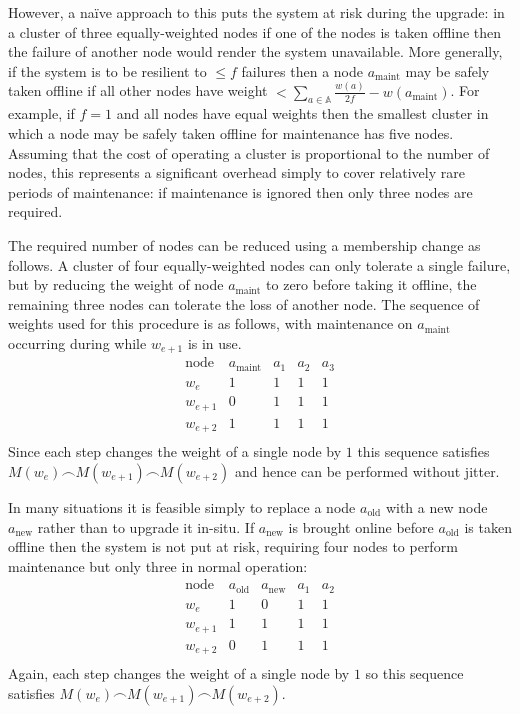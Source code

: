 \documentclass[journal]{IEEEtran}
\begin{document}
However, a na\"ive approach to this puts the system at risk during the upgrade:
in a cluster of three equally-weighted nodes if one of the nodes is taken
offline then the failure of another node would render the system unavailable.
More generally, if the system is to be resilient to $\le f$ failures then a
node $a_{\textrm{maint}}$ may be safely taken offline if all other nodes have
weight $< \sum_{a \in \mathbb A} \frac{w(a)}{2f} - w(a_{\textrm{maint}})$. For
example, if $f = 1$ and all nodes have equal weights then the smallest cluster
in which a node may be safely taken offline for maintenance has five nodes.
Assuming that the cost of operating a cluster is proportional to the number of
nodes, this represents a significant overhead simply to cover relatively rare
periods of maintenance: if maintenance is ignored then only three nodes are
required.

The required number of nodes can be reduced using a membership change as
follows. A cluster of four equally-weighted nodes can only tolerate a single
failure, but by reducing the weight of node $a_{\textrm{maint}}$ to zero before
taking it offline, the remaining three nodes can tolerate the loss of another
node. The sequence of weights used for this procedure is as follows, with
maintenance on $a_{\textrm{maint}}$ occurring during while $w_{e+1}$ is in use.
\[\begin{array}{rcccc}
\textrm{node}&a_{\textrm{maint}}&a_1&a_2&a_3 \\
w_e&1&1&1&1\\
w_{e+1}&0&1&1&1\\
w_{e+2}&1&1&1&1\\
\end{array}\]
Since each step changes the weight of a single node by $1$ this sequence
satisfies $M(w_e) \frown M(w_{e+1}) \frown M(w_{e+2})$ and hence can be
performed without jitter.

In many situations it is feasible simply to replace a node $a_{\textrm{old}}$
with a new node $a_{\textrm{new}}$ rather than to upgrade it in-situ. If
$a_{\textrm{new}}$ is brought online before $a_{\textrm{old}}$ is taken offline
then the system is not put at risk, requiring four nodes to perform maintenance
but only three in normal operation:
\[\begin{array}{rcccc}
\textrm{node}&a_{\textrm{old}}&a_{\textrm{new}}&a_1&a_2 \\
w_e&1&0&1&1\\
w_{e+1}&1&1&1&1\\
w_{e+2}&0&1&1&1\\
\end{array}\]
Again, each step changes the weight of a single node by $1$ so this sequence
satisfies $M(w_e) \frown M(w_{e+1}) \frown M(w_{e+2})$.
\end{document}

